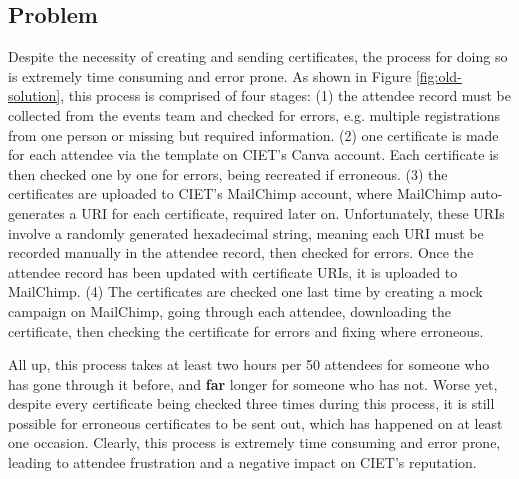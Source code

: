 \documentclass[11pt]{article}
\begin{document}
\subsection{Problem}

Despite the necessity of creating and sending certificates, the process for doing so is extremely time consuming and error prone. As shown in Figure \ref{fig:old-solution}, this process is comprised of four stages: (1) the attendee record must be collected from the events team and checked for errors, e.g. multiple registrations from one person or missing but required information. (2) one certificate is made for each attendee via the template on CIET's Canva account. Each certificate is then checked one by one for errors, being recreated if erroneous. (3) the certificates are uploaded to CIET's MailChimp account, where MailChimp auto-generates a URI for each certificate, required later on. Unfortunately, these URIs involve a randomly generated hexadecimal string, meaning each URI must be recorded manually in the attendee record, then checked for errors. Once the attendee record has been updated with certificate URIs, it is uploaded to MailChimp. (4) The certificates are checked one last time by creating a mock campaign on MailChimp, going through each attendee, downloading the certificate, then checking the certificate for errors and fixing where erroneous.

All up, this process takes at least two hours per 50 attendees for someone who has gone through it before, and \textbf{far} longer for someone who has not. Worse yet, despite every certificate being checked three times during this process, it is still possible for erroneous certificates to be sent out, which has happened on at least one occasion. Clearly, this process is extremely time consuming and error prone, leading to attendee frustration and a negative impact on CIET's reputation.

\newpage
\end{document}
